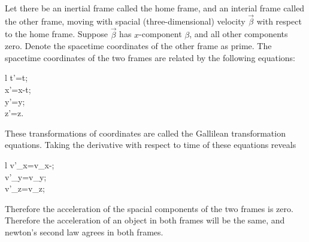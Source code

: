 \documentclass{article}
\begin{document}
\begin{example}
	Let there be an inertial frame called the home frame, and an interial frame called the other frame, moving with spacial (three-dimensional) velocity \(\vec{\beta}\) with respect to the home frame. Suppose \(\vec{\beta}\) has \(x\)-component \(\beta\), and all other components zero. Denote the spacetime coordinates of the other frame as prime. The spacetime coordinates of the two frames are related by the following equations:
	\begin{IEEEeqnarray*}{l}
		t'=t;\\
		x'=x-\beta t;\\
		y'=y;\\
		z'=z.
	\end{IEEEeqnarray*}
	These transformations of coordinates are called the Gallilean transformation equations. Taking the derivative with respect to time of these equations reveals
	\begin{IEEEeqnarray*}{l}
		v'_x=v_x-\beta;\\
		v'_y=v_y;\\
		v'_z=v_z;\\
	\end{IEEEeqnarray*}
	Therefore the acceleration of the spacial components of the two frames is zero. Therefore the acceleration of an object in both frames will be the same, and newton's second law agrees in both frames.
\end{example}
\end{document}

